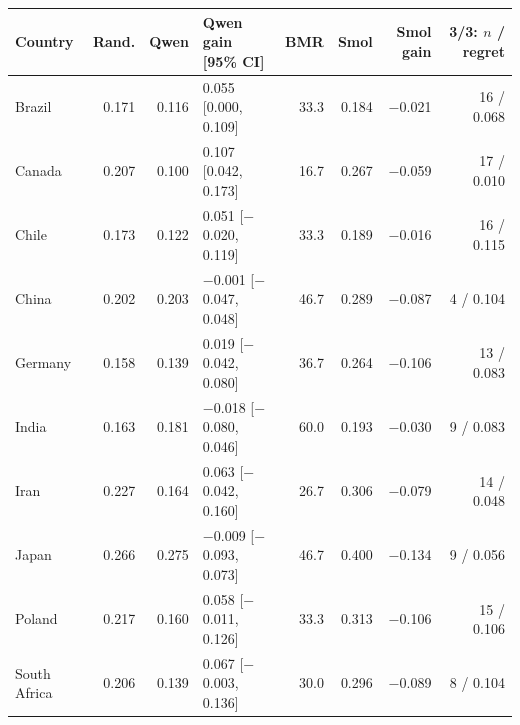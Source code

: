 

\footnotesize
\begin{tabular*}{\textwidth}{@{\extracolsep{\fill}}lrrlrrrr}
\toprule
Country & Rand. & Qwen & Qwen gain [95\% CI] & BMR & Smol & Smol gain & 3/3: $n$ / regret\\
\midrule
Brazil & 0.171 & 0.116 & 0.055 [0.000, 0.109] & 33.3 & 0.184 & $-$0.021 & 16 / 0.068\\
Canada & 0.207 & 0.100 & 0.107 [0.042, 0.173] & 16.7 & 0.267 & $-$0.059 & 17 / 0.010\\
Chile & 0.173 & 0.122 & 0.051 [$-$0.020, 0.119] & 33.3 & 0.189 & $-$0.016 & 16 / 0.115\\
China & 0.202 & 0.203 & $-$0.001 [$-$0.047, 0.048] & 46.7 & 0.289 & $-$0.087 & 4 / 0.104\\
Germany & 0.158 & 0.139 & 0.019 [$-$0.042, 0.080] & 36.7 & 0.264 & $-$0.106 & 13 / 0.083\\
India & 0.163 & 0.181 & $-$0.018 [$-$0.080, 0.046] & 60.0 & 0.193 & $-$0.030 & 9 / 0.083\\
Iran & 0.227 & 0.164 & 0.063 [$-$0.042, 0.160] & 26.7 & 0.306 & $-$0.079 & 14 / 0.048\\
Japan & 0.266 & 0.275 & $-$0.009 [$-$0.093, 0.073] & 46.7 & 0.400 & $-$0.134 & 9 / 0.056\\
Poland & 0.217 & 0.160 & 0.058 [$-$0.011, 0.126] & 33.3 & 0.313 & $-$0.106 & 15 / 0.106\\
South Africa & 0.206 & 0.139 & 0.067 [$-$0.003, 0.136] & 30.0 & 0.296 & $-$0.089 & 8 / 0.104\\
\bottomrule
\end{tabular*}
